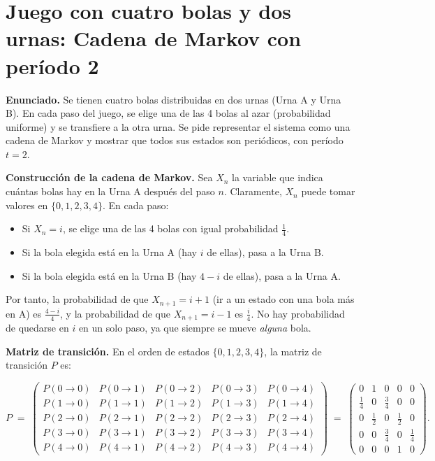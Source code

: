 \documentclass[12pt]{article}
\begin{document}
\section*{Juego con cuatro bolas y dos urnas: Cadena de Markov con período 2}

\textbf{Enunciado.} Se tienen cuatro bolas distribuidas en dos urnas (Urna A y Urna B). 
En cada paso del juego, se elige una de las 4 bolas al azar (probabilidad uniforme) y 
se transfiere a la otra urna. Se pide representar el sistema como una cadena de Markov 
y mostrar que todos sus estados son periódicos, con período $t = 2$.

\medskip

\textbf{Construcción de la cadena de Markov.}
Sea $X_n$ la variable que indica cuántas bolas hay en la Urna A después del paso $n$. 
Claramente, $X_n$ puede tomar valores en $\{0,1,2,3,4\}$. En cada paso:

\begin{itemize}
    \item Si $X_n = i$, se elige una de las 4 bolas con igual probabilidad $\frac{1}{4}$.
    \item Si la bola elegida está en la Urna A (hay $i$ de ellas), pasa a la Urna B.
    \item Si la bola elegida está en la Urna B (hay $4 - i$ de ellas), pasa a la Urna A.
\end{itemize}

Por tanto, la probabilidad de que $X_{n+1} = i+1$ (ir a un estado con una bola más en A) 
es $\frac{4-i}{4}$, y la probabilidad de que $X_{n+1} = i-1$ es $\frac{i}{4}$.
No hay probabilidad de quedarse en $i$ en un solo paso, ya que siempre se mueve \emph{alguna} bola.

\medskip

\textbf{Matriz de transición.}
En el orden de estados $\{0, 1, 2, 3, 4\}$, la matriz de transición $P$ es:

\[
P \;=\;
\begin{pmatrix}
P(0\!\to\!0) & P(0\!\to\!1) & P(0\!\to\!2) & P(0\!\to\!3) & P(0\!\to\!4)\\[6pt]
P(1\!\to\!0) & P(1\!\to\!1) & P(1\!\to\!2) & P(1\!\to\!3) & P(1\!\to\!4)\\[6pt]
P(2\!\to\!0) & P(2\!\to\!1) & P(2\!\to\!2) & P(2\!\to\!3) & P(2\!\to\!4)\\[6pt]
P(3\!\to\!0) & P(3\!\to\!1) & P(3\!\to\!2) & P(3\!\to\!3) & P(3\!\to\!4)\\[6pt]
P(4\!\to\!0) & P(4\!\to\!1) & P(4\!\to\!2) & P(4\!\to\!3) & P(4\!\to\!4)
\end{pmatrix}
\;=\;
\begin{pmatrix}
0 & 1 & 0 & 0 & 0 \\
\tfrac{1}{4} & 0 & \tfrac{3}{4} & 0 & 0 \\
0 & \tfrac{1}{2} & 0 & \tfrac{1}{2} & 0 \\
0 & 0 & \tfrac{3}{4} & 0 & \tfrac{1}{4} \\
0 & 0 & 0 & 1 & 0
\end{pmatrix}.
\]
\end{document}
